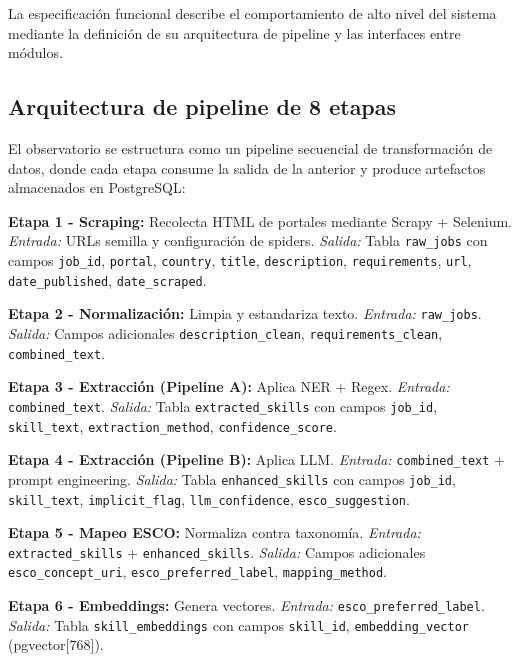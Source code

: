 La especificación funcional describe el comportamiento de alto nivel del sistema mediante la definición de su arquitectura de pipeline y las interfaces entre módulos.

\subsection{Arquitectura de pipeline de 8 etapas}

El observatorio se estructura como un pipeline secuencial de transformación de datos, donde cada etapa consume la salida de la anterior y produce artefactos almacenados en PostgreSQL:

\textbf{Etapa 1 - Scraping:} Recolecta HTML de portales mediante Scrapy + Selenium. \textit{Entrada:} URLs semilla y configuración de spiders. \textit{Salida:} Tabla \texttt{raw\_jobs} con campos \texttt{job\_id}, \texttt{portal}, \texttt{country}, \texttt{title}, \texttt{description}, \texttt{requirements}, \texttt{url}, \texttt{date\_published}, \texttt{date\_scraped}.

\textbf{Etapa 2 - Normalización:} Limpia y estandariza texto. \textit{Entrada:} \texttt{raw\_jobs}. \textit{Salida:} Campos adicionales \texttt{description\_clean}, \texttt{requirements\_clean}, \texttt{combined\_text}.

\textbf{Etapa 3 - Extracción (Pipeline A):} Aplica NER + Regex. \textit{Entrada:} \texttt{combined\_text}. \textit{Salida:} Tabla \texttt{extracted\_skills} con campos \texttt{job\_id}, \texttt{skill\_text}, \texttt{extraction\_\allowbreak method}, \texttt{confidence\_\allowbreak score}.

\textbf{Etapa 4 - Extracción (Pipeline B):} Aplica LLM. \textit{Entrada:} \texttt{combined\_text} + prompt engineering. \textit{Salida:} Tabla \texttt{enhanced\_skills} con campos \texttt{job\_id}, \texttt{skill\_text}, \texttt{implicit\_flag}, \texttt{llm\_\allowbreak confidence}, \texttt{esco\_\allowbreak suggestion}.

\textbf{Etapa 5 - Mapeo ESCO:} Normaliza contra taxonomía. \textit{Entrada:} \texttt{extracted\_skills} + \texttt{enhanced\_skills}. \textit{Salida:} Campos adicionales \texttt{esco\_\allowbreak concept\_\allowbreak uri}, \texttt{esco\_\allowbreak preferred\_\allowbreak label}, \texttt{mapping\_\allowbreak method}.

\textbf{Etapa 6 - Embeddings:} Genera vectores. \textit{Entrada:} \texttt{esco\_\allowbreak preferred\_\allowbreak label}. \textit{Salida:} Tabla \texttt{skill\_\allowbreak embeddings} con campos \texttt{skill\_id}, \texttt{embedding\_\allowbreak vector} (pgvector[768]).

